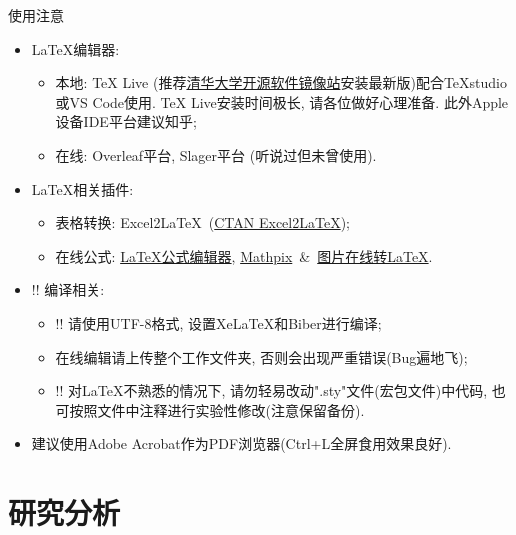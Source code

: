 \documentclass[hyperref,UTF8,11pt,CJK,handout]{beamer}
\begin{document}
\begin{frame}{使用注意}
	\begin{itemize}
		\item<1-> \LaTeX 编辑器:
		\begin{itemize}
			\item<1-> 本地: TeX Live (推荐\href{https://mirrors.tuna.tsinghua.edu.cn/CTAN/systems/texlive/Images/}{\color{BSblue}清华大学开源软件镜像站}安装最新版)配合TeXstudio或VS Code使用. TeX Live安装时间极长, 请各位做好心理准备. 此外Apple设备IDE平台建议知乎;
			\item<1-> 在线: Overleaf平台, Slager平台 (听说过但未曾使用).
		\end{itemize}
		\item<2-> \LaTeX 相关插件:
		\begin{itemize}
			\item<2-> 表格转换: Excel2\LaTeX~(\href{https://www.ctan.org/tex-archive/support/excel2latex/}{\color{BSblue}CTAN Excel2\LaTeX});
			\item<2-> 在线公式: \href{https://www.latexlive.com/}{\color{BSblue}LaTeX公式编辑器}, \href{https://mathpix.com/}{\color{BSblue}
				Mathpix}~\&~\href{https://mathf.itewqq.cn/}{\color{BSblue}图片在线转LaTeX}.
		\end{itemize}
		\item<3-> \color{JXred}!! 编译相关:
		\begin{itemize}
			\item<3-> \color{JXred}!! 请使用UTF-8格式, 设置XeLaTeX和Biber进行编译;
			\item<3-> 在线编辑请上传整个工作文件夹, 否则会出现严重错误(Bug遍地飞);
			\item<3-> \color{JXred}!! 对\LaTeX 不熟悉的情况下, 请勿轻易改动".sty"文件(宏包文件)中代码, 也可按照文件中注释进行实验性修改(注意保留备份).
		\end{itemize}
		\item<4-> \color{JXred} 建议使用Adobe Acrobat作为PDF浏览器(Ctrl+L全屏食用效果良好).
	\end{itemize}
\end{frame}

\section{研究分析}
\end{document}
